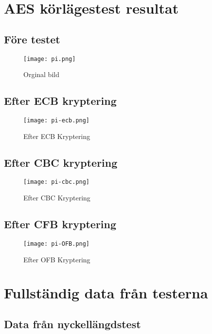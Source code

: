 \appendix

\chapter{AES körlägestest resultat}
\label{app:raw-data-mode-picture-test}

\section{Före testet}
\begin{figure}[H]
  \centering
  \texttt{[image: pi.png]}
  \caption{Orginal bild}
  \label{fig:pi-original}
\end{figure}

\section{Efter ECB kryptering}
\begin{figure}[H]
  \centering
  \texttt{[image: pi-ecb.png]}
  \caption{Efter ECB Kryptering}
  \label{fig:pi-ecb}
\end{figure}

\section{Efter CBC kryptering}
\begin{figure}[H]
  \centering
  \texttt{[image: pi-cbc.png]}
  \caption{Efter CBC Kryptering}
  \label{fig:pi-cbc}
\end{figure}

\section{Efter CFB kryptering}
\begin{figure}[H]
  \centering
  \texttt{[image: pi-OFB.png]}
  \caption{Efter OFB Kryptering}
  \label{fig:pi-ofb}
\end{figure}

\cleardoublepage

\chapter{Fullständig data från testerna}
\label{app:raw-data}

\section{Data från nyckellängdstest}
\label{app:raw-data-keylength}

